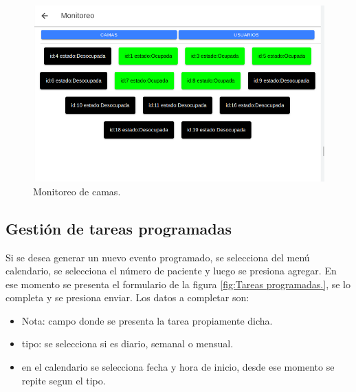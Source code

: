 \begin{figure}[ht]
	\centering
	\includegraphics[scale=.55]{./Figures/monitoreo-camas.png}
	\caption{Monitoreo de camas.}
	\label{fig:Monitoreo de camas.}
\end{figure} 

\subsection{Gestión de tareas programadas}

Si se desea generar un nuevo evento programado, se selecciona del menú  calendario, se selecciona el número de paciente y luego se presiona agregar. En ese momento se presenta el formulario de la figura \ref{fig:Tareas programadas.}, se lo completa y se presiona enviar. Los datos a completar son:
\begin{itemize}
\item Nota: campo donde se presenta la tarea propiamente dicha.
\item tipo: se selecciona si es diario, semanal o mensual.
\item en el calendario se selecciona fecha y hora de inicio, desde ese momento se repite segun el tipo.
\end{itemize}

